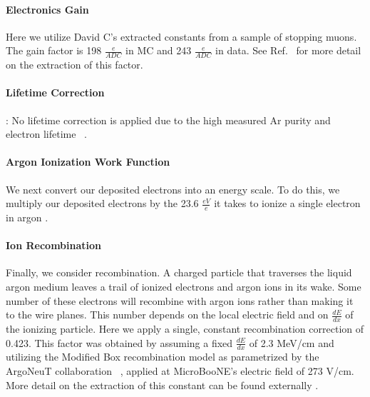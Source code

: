 \paragraph{Electronics Gain} 
Here we utilize David C’s extracted constants from a sample of stopping muons.  The gain factor is 198 $\frac{e}{ADC}$ in MC and 243 $\frac{e}{ADC}$ in data. See Ref.~\cite{bib:davidc_energycalibration_gain} for more detail on the extraction of this factor.
\paragraph{ Lifetime Correction}: No lifetime correction is applied due to the high measured Ar purity and electron lifetime ~\cite{bib:purity}. 
\paragraph{Argon Ionization Work Function} We next convert our deposited electrons into an energy scale. To do this, we multiply our deposited electrons by the 23.6 $\frac{eV}{e}$ it takes to ionize a single electron in argon \cite{bib:ionization_per_electron}. 
\paragraph{Ion Recombination} Finally, we consider recombination.  A charged particle that traverses the liquid argon medium leaves a trail of ionized electrons and argon ions in its wake.  Some number of these electrons will recombine with argon ions rather than making it to the wire planes. This number depends on the local electric field and on $\frac{dE}{dx}$ of the ionizing particle. Here we apply a single, constant recombination correction of 0.423. This factor was obtained by assuming a fixed $\frac{dE}{dx}$ of 2.3 MeV/cm  and utilizing the Modified Box recombination model as parametrized by the ArgoNeuT collaboration ~\cite{bib:argoneut_recomb}, applied at MicroBooNE's electric field of 273 V/cm.  More detail on the extraction of this constant can be found externally \cite{bib:davidc_recomb}.
